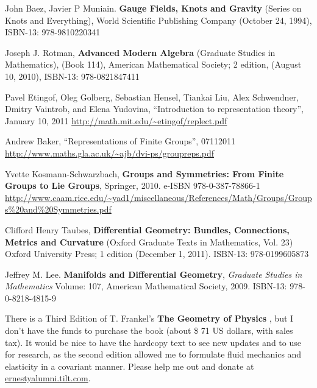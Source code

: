 \documentclass[10pt]{amsart}
\begin{document}
\begin{thebibliography}{9}

John Baez, Javier P Muniain.  \textbf{Gauge Fields, Knots and Gravity} (Series on Knots and Everything), World Scientific Publishing Company (October 24, 1994), ISBN-13: 978-9810220341

Joseph J. Rotman, \textbf{Advanced Modern Algebra} (Graduate Studies in Mathematics), (Book 114), American Mathematical Society; 2 edition, (August 10, 2010), ISBN-13: 978-0821847411

Pavel Etingof, Oleg Golberg, Sebastian Hensel, Tiankai Liu, Alex Schwendner, Dmitry Vaintrob, and Elena Yudovina, ``Introduction to representation theory'', January 10, 2011
\url{http://math.mit.edu/~etingof/replect.pdf}

Andrew Baker, ``Representations of Finite Groups'', 07112011
\url{http://www.maths.gla.ac.uk/~ajb/dvi-ps/groupreps.pdf}

Yvette Kosmann-Schwarzbach, \textbf{Groups and Symmetries: From Finite Groups to Lie Groups}, Springer, 2010. e-ISBN 978-0-387-78866-1 \url{http://www.caam.rice.edu/~yad1/miscellaneous/References/Math/Groups/Groups\%20and\%20Symmetries.pdf}

Clifford Henry Taubes, \textbf{Differential Geometry: Bundles, Connections, Metrics and Curvature} (Oxford Graduate Texts in Mathematics, Vol. 23) Oxford University Press; 1 edition (December 1, 2011). ISBN-13: 978-0199605873

Jeffrey M. Lee. \textbf{Manifolds and Differential Geometry}, \emph{Graduate Studies in Mathematics} Volume: 107, American Mathematical Society, 2009. ISBN-13: 978-0-8218-4815-9

\end{thebibliography}
There is a Third Edition of T. Frankel's \textbf{The Geometry of Physics} \cite{TFrankel2004}, but I don't have the funds to purchase the book (about \$ 71 US dollars, with sales tax). It would be nice to have the hardcopy text to see new updates and to use for research, as the second edition allowed me to formulate fluid mechanics and elasticity in a covariant manner.  Please help me out and donate at \url{ernestyalumni.tilt.com}.  




\clearpage
\onecolumn
\end{document}
